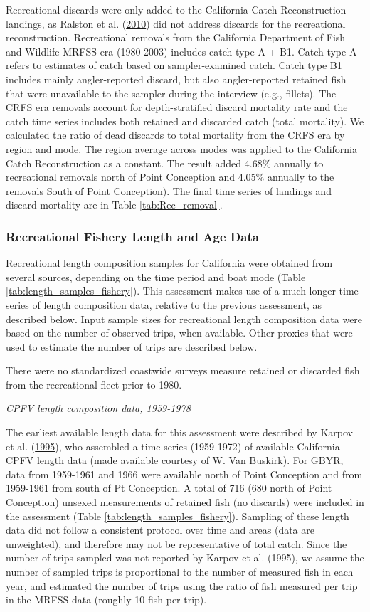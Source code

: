 \documentclass[12pt,]{article}
\begin{document}
Recreational discards were only added to the California Catch
Reconstruction landings, as Ralston et al.
(\protect\hyperlink{ref-Ralston2010}{2010}) did not address discards for
the recreational reconstruction. Recreational removals from the
California Department of Fish and Wildlife MRFSS era (1980-2003)
includes catch type A + B1. Catch type A refers to estimates of catch
based on sampler-examined catch. Catch type B1 includes mainly
angler-reported discard, but also angler-reported retained fish that
were unavailable to the sampler during the interview (e.g., fillets).
The CRFS era removals account for depth-stratified discard mortality
rate and the catch time series includes both retained and discarded
catch (total mortality). We calculated the ratio of dead discards to
total mortality from the CRFS era by region and mode. The region average
across modes was applied to the California Catch Reconstruction as a
constant. The result added 4.68\% annually to recreational removals
north of Point Conception and 4.05\% annually to the removals South of
Point Conception). The final time series of landings and discard
mortality are in Table \ref{tab:Rec_removal}.

\subsubsection{Recreational Fishery Length and Age
Data}\label{recreational-fishery-length-and-age-data}

Recreational length composition samples for California were obtained
from several sources, depending on the time period and boat mode (Table
\ref{tab:length_samples_fishery}). This assessment makes use of a much
longer time series of length composition data, relative to the previous
assessment, as described below. Input sample sizes for recreational
length composition data were based on the number of observed trips, when
available. Other proxies that were used to estimate the number of trips
are described below.

There were no standardized coastwide surveys measure retained or
discarded fish from the recreational fleet prior to 1980.

\emph{CPFV length composition data, 1959-1978}

The earliest available length data for this assessment were described by
Karpov et al. (\protect\hyperlink{ref-Karpov1995}{1995}), who assembled
a time series (1959-1972) of available California CPFV length data (made
available courtesy of W. Van Buskirk). For GBYR, data from 1959-1961 and
1966 were available north of Point Conception and from 1959-1961 from
south of Pt Conception. A total of 716 (680 north of Point Conception)
unsexed measurements of retained fish (no discards) were included in the
assessment (Table \ref{tab:length_samples_fishery}). Sampling of these
length data did not follow a consistent protocol over time and areas
(data are unweighted), and therefore may not be representative of total
catch. Since the number of trips sampled was not reported by Karpov et
al. (1995), we assume the number of sampled trips is proportional to the
number of measured fish in each year, and estimated the number of trips
using the ratio of fish measured per trip in the MRFSS data (roughly 10
fish per trip).
\end{document}
